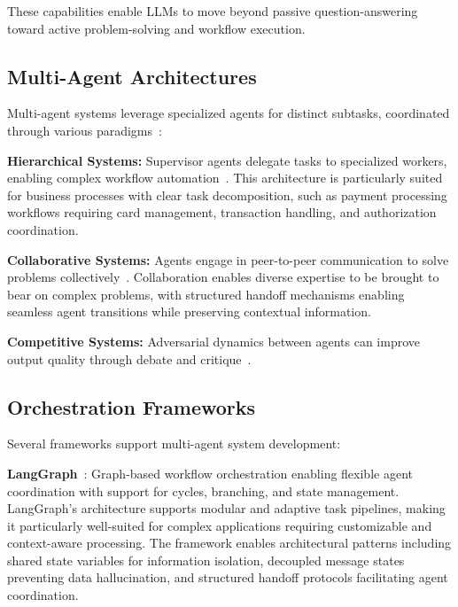 These capabilities enable LLMs to move beyond passive question-answering toward active problem-solving and workflow execution.

\subsection{Multi-Agent Architectures}

Multi-agent systems leverage specialized agents for distinct subtasks, coordinated through various paradigms~\cite{wang2024surveyllm-mas,tran2025mascollab,guo2024mascollab}:

\textbf{Hierarchical Systems:} Supervisor agents delegate tasks to specialized workers, enabling complex workflow automation~\cite{hong2024metagpt}. This architecture is particularly suited for business processes with clear task decomposition, such as payment processing workflows requiring card management, transaction handling, and authorization coordination.%

\textbf{Collaborative Systems:} Agents engage in peer-to-peer communication to solve problems collectively~\cite{li2023camel}. Collaboration enables diverse expertise to be brought to bear on complex problems, with structured handoff mechanisms enabling seamless agent transitions while preserving contextual information.

\textbf{Competitive Systems:} Adversarial dynamics between agents can improve output quality through debate and critique~\cite{du2023debate}.

\subsection{Orchestration Frameworks}

Several frameworks support multi-agent system development:

\textbf{LangGraph}~\cite{langgraph_docs,langgraph_github}: Graph-based workflow orchestration enabling flexible agent coordination with support for cycles, branching, and state management. LangGraph's architecture supports modular and adaptive task pipelines, making it particularly well-suited for complex applications requiring customizable and context-aware processing. The framework enables architectural patterns including shared state variables for information isolation, decoupled message states preventing data hallucination, and structured handoff protocols facilitating agent coordination.

